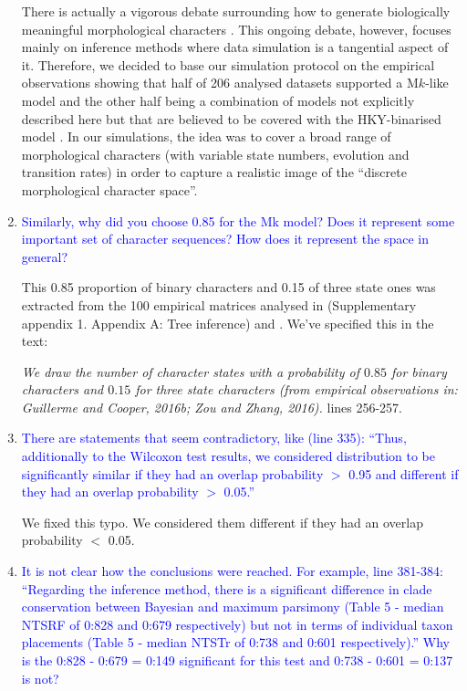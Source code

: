 \documentclass[12pt,letterpaper]{article}
\begin{document}
\begin{enumerate}
There is actually a vigorous debate surrounding how to generate biologically meaningful morphological characters \citep[][]{OReilly20160081,goloboff2017weighted,puttick2017uncertain,GoloboffEmpirical,OReillyEmpirical}.
This ongoing debate, however, focuses mainly on inference methods where data simulation is a tangential aspect of it.
Therefore, we decided to base our simulation protocol on the empirical observations showing that half of 206 analysed datasets supported a M$k$-like model \citep[][Fig. 3]{Wright01072016} and the other half being a combination of models not explicitly described here but that are believed to be covered with the HKY-binarised model \citep{puttick2017uncertain,OReillyEmpirical}.
In our simulations, the idea was to cover a broad range of morphological characters (with variable state numbers, evolution and transition rates) in order to capture a realistic image of the ``discrete morphological character space''.

\item{\textcolor{blue}{Similarly, why did you choose 0.85 for the Mk model? Does it represent some important set of character sequences? How does it represent the space in general?}}

This 0.85 proportion of binary characters and 0.15 of three state ones was extracted from the 100 empirical matrices analysed in \cite{Guillerme2016146} (Supplementary appendix 1. Appendix A: Tree inference) and \cite{ZouConvergence}.
We've specified this in the text:

\textit{We draw the number of character states with a probability of $0.85$ for binary characters and $0.15$ for three state characters (from empirical observations in: Guillerme and Cooper, 2016b; Zou and Zhang, 2016).} lines 256-257.

\item{\textcolor{blue}{There are statements that seem contradictory, like (line 335): ``Thus, additionally to the Wilcoxon test results, we considered distribution to be significantly similar if they had an overlap probability $>$ 0.95 and different if they had an overlap probability $>$ 0.05.''}}

We fixed this typo. We considered them different if they had an overlap probability $<$ 0.05.

\item{\textcolor{blue}{It is not clear how the conclusions were reached. For example, line 381-384: ``Regarding the inference method, there is a significant difference in clade conservation between Bayesian and maximum parsimony (Table 5 - median NTSRF of 0:828 and 0:679 respectively) but not in terms of individual taxon placements (Table 5 - median NTSTr of 0:738 and 0:601 respectively).'' Why is the 0:828 - 0:679 = 0:149 significant for this test and 0:738 - 0:601 = 0:137 is not?}}


\end{enumerate}
\end{document}
